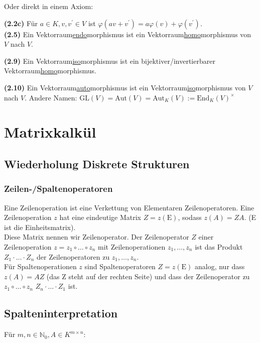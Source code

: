 \documentclass[11pt]{scrartcl}
\newlength{\hangwidth}
\newcommand{\skript}[1]{\settowidth{\hangwidth}{\textbf{(#1)} }\hangpara{\hangwidth}{1}\textbf{(#1)} }
\begin{document}
Oder direkt in einem Axiom:

\skript{2.2c} Für $a \in K, v, v^\prime \in V$ ist $\varphi(av + v^\prime) = a \varphi(v) + \varphi(v^\prime)$.\\

\skript{2.5} Ein Vektorraum\underline{endo}morphismus ist ein Vektorraum\underline{homo}morphismus von $V$ nach $V$.

\skript{2.9} Ein Vektorraum\underline{iso}morphismus ist ein bijektiver/invertierbarer Vektorraum\underline{homo}morphismus.

\skript{2.10} Ein Vektorraum\underline{auto}morphismus ist ein Vektorraum\underline{iso}morphismus von $V$ nach $V$. Andere Namen: $\textrm{GL}(V) = \textrm{Aut}(V) = \textrm{Aut}_K(V) := \textrm{End}_K(V)^\times$

\section{Matrixkalkül}

\subsection{Wiederholung Diskrete Strukturen}

\subsubsection{Zeilen-/Spaltenoperatoren}

Eine Zeilenoperation ist eine Verkettung von Elementaren Zeilenoperatoren.
Eine Zeilenoperation $z$ hat eine eindeutige Matrix $Z = z(\mathrm{E})$, sodass $z(A) = ZA$. (E ist die Einheitsmatrix).	\\
Diese Matrix nennen wir Zeilenoperator. Der Zeilenoperator $Z$ einer Zeilenoperation $z = z_1 \circ \ldots \circ z_n$ mit Zeilenoperationen $z_1,\ldots,z_n$ ist das Produkt $Z_1 \cdot \ldots \cdot Z_n$ der Zeilenoperatoren zu $z_1,\ldots,z_n$.	\\
Für Spaltenoperationen $z$ sind Spaltenoperatoren $Z = z(\mathrm{E})$ analog, nur dass $z(A) = AZ$ (das Z steht auf der rechten Seite) und dass der Zeilenoperator zu $z_1 \circ \ldots \circ z_n$ $Z_n \cdot \ldots \cdot Z_1$ ist.

\subsection{Spalteninterpretation}

Für $m,n \in \mathbb{N}_0, A \in K^{m \times n}$:
\end{document}
